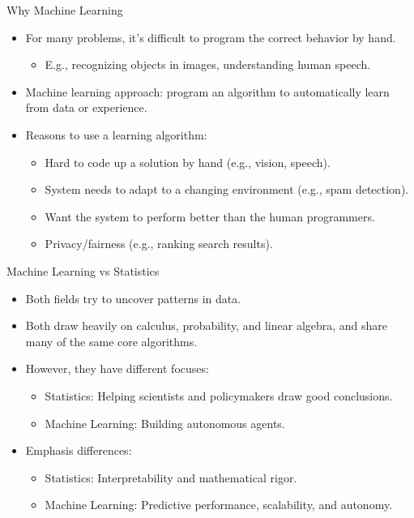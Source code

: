 \documentclass{beamer}
\begin{document}
\begin{frame}{Why Machine Learning}
    \begin{itemize}
        \item For many problems, it’s difficult to program the correct behavior by hand.
        \begin{itemize}
            \item E.g., recognizing objects in images, understanding human speech.
        \end{itemize}
        \item Machine learning approach: program an algorithm to automatically learn from data or experience.
        \item Reasons to use a learning algorithm:
        \begin{itemize}
            \item Hard to code up a solution by hand (e.g., vision, speech).
            \item System needs to adapt to a changing environment (e.g., spam detection).
            \item Want the system to perform better than the human programmers.
            \item Privacy/fairness (e.g., ranking search results).
        \end{itemize}
    \end{itemize}
\end{frame}

\begin{frame}{Machine Learning vs Statistics}
    \begin{itemize}
        \item Both fields try to uncover patterns in data.
        \item Both draw heavily on calculus, probability, and linear algebra, and share many of the same core algorithms.
        \item However, they have different focuses:
        \begin{itemize}
            \item Statistics: Helping scientists and policymakers draw good conclusions.
            \item Machine Learning: Building autonomous agents.
        \end{itemize}
        \item Emphasis differences:
        \begin{itemize}
            \item Statistics: Interpretability and mathematical rigor.
            \item Machine Learning: Predictive performance, scalability, and autonomy.
        \end{itemize}
    \end{itemize}
\end{frame}
\end{document}
